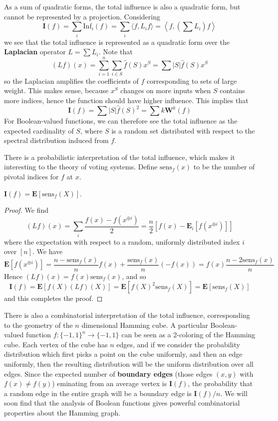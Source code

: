 As a sum of quadratic forms, the total influence is also a quadratic form, but cannot be represented by a projection. Considering
%
\[ \mathbf{I}(f) = \sum_i \text{Inf}_i(f) = \sum_i \langle f, L_i f \rangle = \left\langle f, \left( \sum L_i \right) f \right\rangle \]
%
we see that the total influence is represented as a quadratic form over the {\bf Laplacian} operator $L = \sum L_i$. Note that
%
\[ (Lf)(x) = \sum_{i = 1}^n \sum_{i \in S} \widehat{f}(S) x^S = \sum |S| \widehat{f}(S) x^S \]
%
so the Laplacian amplifies the coefficients of $f$ corresponding to sets of large weight. This makes sense, because $x^S$ changes on more inputs when $S$ contains more indices, hence the function should have higher influence. This implies that
%
\[ \mathbf{I}(f) = \sum |S| \widehat{f}(S)^2 = \sum k \mathbf{W}^k(f) \]
%
For Boolean-valued functions, we can therefore see the total influence as the expected cardinality of $S$, where $S$ is a random set distributed with respect to the spectral distribution induced from $f$.

There is a probabilistic interpretation of the total influence, which makes it interesting to the theory of voting systems. Define $\text{sens}_f(x)$ to be the number of pivotal indices for $f$ at $x$.

\begin{theorem} $\mathbf{I}(f) = \mathbf{E}[\text{sens}_f(X)]$. \end{theorem}
\begin{proof}
    We find
    \[ (Lf)(x) = \sum_i \frac{f(x) - f(x^{\oplus i})}{2} = \frac{n}{2} [f(x) - \mathbf{E}_i[f(x^{\oplus i})]] \]
    where the expectation with respect to a random, uniformly distributed index $i$ over $[n]$. We have
    \[ \mathbf{E}[f(x^{\oplus i})] = \frac{n - \text{sens}_f(x)}{n} f(x) + \frac{\text{sens}_f(x)}{n} (-f(x)) = f(x) \frac{n - 2 \text{sens}_f(x)}{n} \]
    Hence $(Lf)(x) = f(x) \text{sens}_f(x)$, and so
    \[ \mathbf{I}(f) = \mathbf{E}[f(X) (Lf)(X)] = \mathbf{E}[f(X)^2 \text{sens}_f(X)] = \mathbf{E}[\text{sens}_f(X)] \]
    and this completes the proof.
\end{proof}

There is also a combinatorial interpretation of the total influence, corresponding to the geometry of the $n$ dimensional Hamming cube. A particular Boolean-valued function $f: \{ -1, 1 \}^n \to \{ -1, 1 \}$ can be seen as a 2-coloring of the Hamming cube. Each vertex of the cube has $n$ edges, and if we consider the probability distribution which first picks a point on the cube uniformly, and then an edge uniformly, then the resulting distribution will be the uniform distribution over all edges. Since the expected number of {\bf boundary edges} (those edges $(x,y)$ with $f(x) \neq f(y)$) eminating from an average vertex is $\mathbf{I}(f)$, the probability that a random edge in the entire graph will be a boundary edge is $\mathbf{I}(f)/n$. We will soon find that the analysis of Boolean functions gives powerful combinatorial properties about the Hamming graph.

